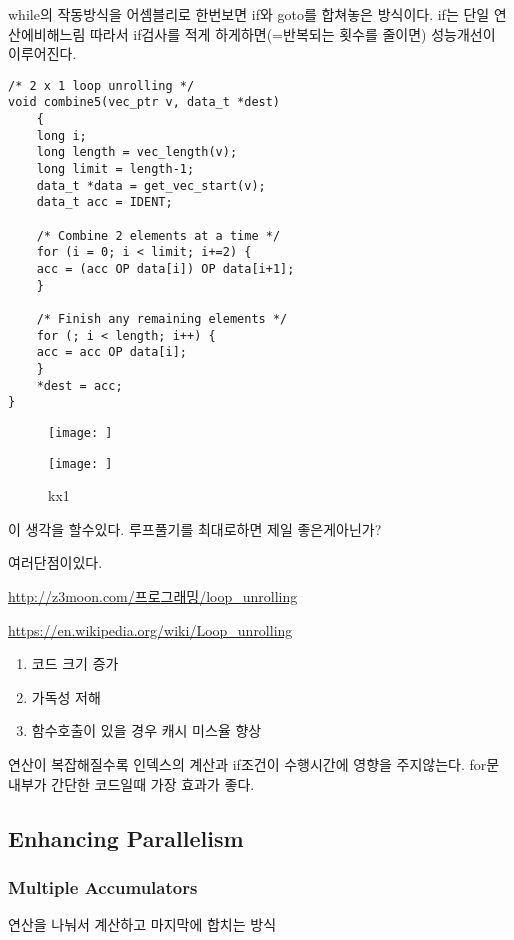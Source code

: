 while의 작동방식을 어셈블리로 한번보면 
if와  goto를 합쳐놓은 방식이다.
if는 단일 연산에비해느림 따라서
if검사를 적게 하게하면(=반복되는 횟수를 줄이면) 성능개선이 이루어진다.

\begin{lstlisting}[style = CStyle]
/* 2 x 1 loop unrolling */
void combine5(vec_ptr v, data_t *dest)
    {
    long i;
    long length = vec_length(v);
    long limit = length-1;
    data_t *data = get_vec_start(v);
    data_t acc = IDENT;

    /* Combine 2 elements at a time */
    for (i = 0; i < limit; i+=2) {
    acc = (acc OP data[i]) OP data[i+1];
    }

    /* Finish any remaining elements */
    for (; i < length; i++) {
    acc = acc OP data[i];
    }
    *dest = acc;
}
\end{lstlisting}


\begin{figure}[h!]
    \centering
    \texttt{[image: ]}
    \caption{}
\end{figure}


\begin{figure}[h!]
    \centering
    \texttt{[image: ]}
    \caption{ kx1}
\end{figure}


이 생각을 할수있다.
루프풀기를 최대로하면 제일 좋은게아닌가?

여러단점이있다.

\url{http://z3moon.com/프로그래밍/loop_unrolling}

\url{https://en.wikipedia.org/wiki/Loop_unrolling}

\begin{enumerate}
    \item 코드 크기 증가
    \item 가독성 저해
    \item 함수호출이 있을 경우 캐시 미스율 향상
\end{enumerate}

연산이 복잡해질수록 인덱스의 계산과 if조건이 수행시간에 영향을 주지않는다.
for문 내부가 간단한 코드일때 가장 효과가 좋다.

\subsection{Enhancing Parallelism}

\subsubsection{Multiple Accumulators}
연산을 나눠서 계산하고 마지막에 합치는 방식

